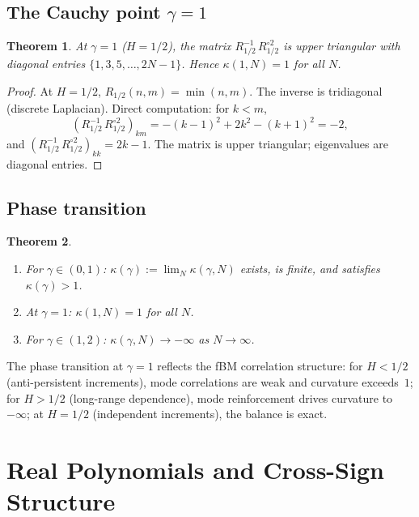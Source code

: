 \documentclass[11pt,a4paper]{article}
\theoremstyle{plain}
\newtheorem{theorem}{Theorem}[section]
\theoremstyle{definition}
\theoremstyle{remark}
\begin{document}
\subsection{The Cauchy point $\gamma = 1$}\label{sec:cauchy}

\begin{theorem}\label{thm:cauchy}
At $\gamma = 1$ ($H = 1/2$), the matrix $R_{1/2}^{-1}\,R_{1/2}^{\circ 2}$
is upper triangular with diagonal entries $\{1, 3, 5, \ldots, 2N-1\}$.
Hence $\kappa(1,N) = 1$ for all $N$.
\end{theorem}

\begin{proof}
At $H=1/2$, $R_{1/2}(n,m) = \min(n,m)$. The inverse is tridiagonal
(discrete Laplacian). Direct computation: for $k < m$,
\[
  (R_{1/2}^{-1}\,R_{1/2}^{\circ 2})_{km}
  = -(k-1)^2 + 2k^2 - (k+1)^2 = -2,
\]
and $(R_{1/2}^{-1}\,R_{1/2}^{\circ 2})_{kk} = 2k-1$.
The matrix is upper triangular; eigenvalues are diagonal entries.
\end{proof}


\subsection{Phase transition}

\begin{theorem}\label{thm:phase-transition}
\begin{enumerate}[label=(\roman*)]
\item For $\gamma \in (0,1)$: $\kappa(\gamma) := \lim_N \kappa(\gamma,N)$
  exists, is finite, and satisfies $\kappa(\gamma) > 1$.
\item At $\gamma = 1$: $\kappa(1,N) = 1$ for all $N$.
\item For $\gamma \in (1,2)$: $\kappa(\gamma,N) \to -\infty$ as
  $N \to \infty$.
\end{enumerate}
\end{theorem}

The phase transition at $\gamma = 1$ reflects the fBM correlation
structure: for $H < 1/2$ (anti-persistent increments), mode
correlations are weak and curvature exceeds~$1$; for $H > 1/2$
(long-range dependence), mode reinforcement drives curvature
to $-\infty$; at $H = 1/2$ (independent increments), the balance
is exact.


\section{Real Polynomials and Cross-Sign Structure}\label{sec:real}
\end{document}
